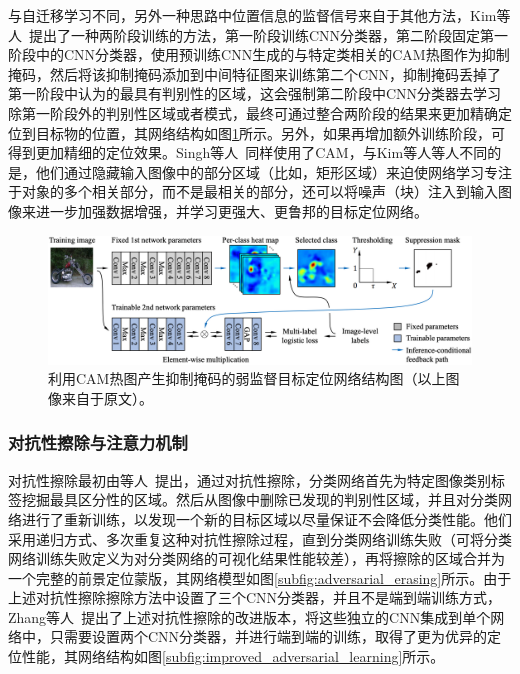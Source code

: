 与自迁移学习不同，另外一种思路中位置信息的监督信号来自于其他方法，Kim等人~\cite{Kim_2017_ICCV}提出了一种两阶段训练的方法，第一阶段训练CNN分类器，第二阶段固定第一阶段中的CNN分类器，使用预训练CNN生成的与特定类相关的CAM热图作为抑制掩码，然后将该抑制掩码添加到中间特征图来训练第二个CNN，抑制掩码丢掉了第一阶段中认为的最具有判别性的区域，这会强制第二阶段中CNN分类器去学习除第一阶段外的判别性区域或者模式，最终可通过整合两阶段的结果来更加精确定位到目标物的位置，其网络结构如图\ref{fig:cam_based_weakly_supervised_localization}所示。另外，如果再增加额外训练阶段，可得到更加精细的定位效果。Singh等人~\cite{Krishna2018}同样使用了CAM，与Kim等人等人不同的是，他们通过隐藏输入图像中的部分区域（比如，矩形区域）来迫使网络学习专注于对象的多个相关部分，而不是最相关的部分，还可以将噪声（块）注入到输入图像来进一步加强数据增强，并学习更强大、更鲁邦的目标定位网络。

\begin{figure}[h]
	\centering
	\includegraphics[width=1.0\textwidth]{figure/cam_based_weakly_supervised_localization}
	\caption{利用CAM热图产生抑制掩码的弱监督目标定位网络结构图（以上图像来自于原文）。} 
	\label{fig:cam_based_weakly_supervised_localization}
\end{figure}

\subsubsection{对抗性擦除与注意力机制}
对抗性擦除最初由等人~\cite{WeiFLCZY17}提出，通过对抗性擦除，分类网络首先为特定图像类别标签挖掘最具区分性的区域。然后从图像中删除已发现的判别性区域，并且对分类网络进行了重新训练，以发现一个新的目标区域以尽量保证不会降低分类性能。他们采用递归方式、多次重复这种对抗性擦除过程，直到分类网络训练失败（可将分类网络训练失败定义为对分类网络的可视化结果性能较差），再将擦除的区域合并为一个完整的前景定位蒙版，其网络模型如图\ref{subfig:adversarial_erasing}所示。由于上述对抗性擦除擦除方法中设置了三个CNN分类器，并且不是端到端训练方式，Zhang等人~\cite{ZhangWF0H18}提出了上述对抗性擦除的改进版本，将这些独立的CNN集成到单个网络中，只需要设置两个CNN分类器，并进行端到端的训练，取得了更为优异的定位性能，其网络结构如图\ref{subfig:improved_adversarial_learning}所示。

